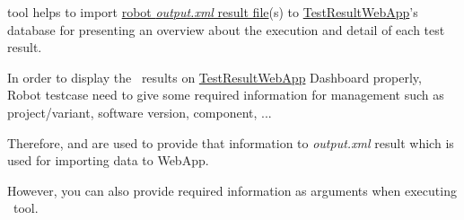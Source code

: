 



\href{https://github.com/test-fullautomation/robotframework-robotlog2db}{\pkg}
tool helps to import  
\href{https://robotframework.org/robotframework/latest/RobotFrameworkUserGuide.html#output-file}
{robot \emph{output.xml} result file}(s) to
\href{https://github.com/test-fullautomation/testresultwebapp}{TestResultWebApp}'s
database for presenting an overview about the execution and detail of
each test result.

In order to display the \rfwcore\ results on
\href{https://github.com/test-fullautomation/testresultwebapp}{TestResultWebApp}
Dashboard properly, Robot testcase need to give some required
information for management such as project/variant, software version,
component, ...

Therefore,  and \rcode{[Tags]} are used to provide
that information to \emph{output.xml} result which is used for importing
data to WebApp.

However, you can also provide required information as arguments when executing
\pkg\ tool.
